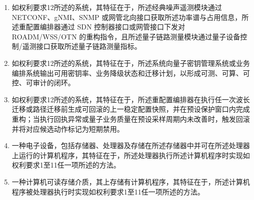 \documentclass[12pt,a4paper]{article}
\begin{document}
\begin{enumerate}[
    label=\arabic*.,
    leftmargin=0pt,
    itemindent=2em,
    labelsep=0.5em,
    align=left,
    itemsep=0.6em,
    topsep=0pt
]
\item 如权利要求12所述的系统，其特征在于，所述经典噪声遥测模块通过 NETCONF、gNMI、SNMP 或网管北向接口获取所述功率谱与占用信息，所述重配置编排器通过 SDN 控制器接口或网管接口下发对 ROADM/WSS/OTN 的重构指令，且所述量子链路测量模块通过量子设备控制/遥测接口获取所述量子链路测量指标。

\item 如权利要求12所述的系统，其特征在于，所述系统向量子密钥管理系统或业务编排系统输出可用密钥率、业务降级状态和迁移计划，以形成可测、可算、可控、可审计的闭环。

\item 如权利要求12所述的系统，其特征在于，所述重配置编排器在执行任一次波长迁移或路径迁移前生成可回滚的上一稳定配置快照，并在预设保护窗口内完成重构；当执行回执异常或量子业务质量在预设采样周期内未改善时，触发回滚并将对应候选动作标记为短期禁用。

\item 一种电子设备，包括存储器、处理器及存储在所述存储器中并可在所述处理器上运行的计算机程序，其特征在于，所述处理器执行所述计算机程序时实现如权利要求1至11任一项所述的方法。

\item 一种计算机可读存储介质，其上存储有计算机程序，其特征在于，所述计算机程序被处理器执行时实现如权利要求1至11任一项所述的方法。

\end{enumerate}
\end{document}
